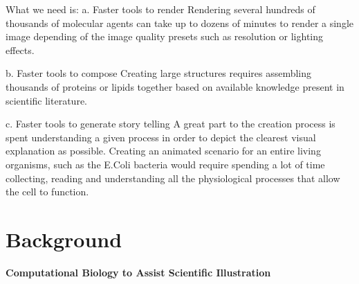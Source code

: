 What we need is:
a. Faster tools to render
	Rendering several hundreds of thousands of molecular agents can take up to dozens of minutes to render a single image depending of the image quality presets such as resolution or lighting effects.

b. Faster tools to compose
	Creating large structures requires assembling thousands of proteins or lipids together based on available knowledge present in scientific literature.

c. Faster tools to generate story telling
	A great part to the creation process is spent understanding a given process in order to depict the clearest visual explanation as possible.
	Creating an animated scenario for an entire living organisms, such as the E.Coli bacteria would require spending a lot of time collecting, reading and understanding all the physiological processes that allow the cell to function.


\section{Background}

\textbf{Computational Biology to Assist Scientific Illustration}

%
%

